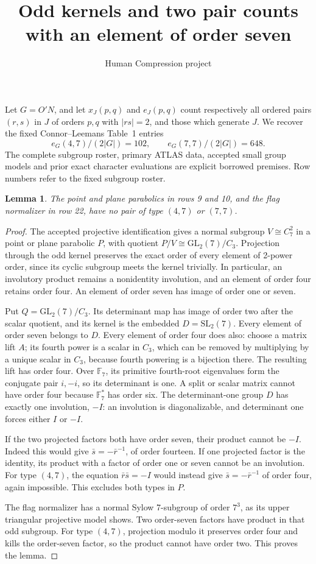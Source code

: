 \documentclass[11pt,a4paper]{article}
\title{Odd kernels and two pair counts with an element of order seven}
\author{Human Compression project}\date{}
\newtheorem{lemma}{Lemma}\newtheorem{theorem}{Theorem}
\begin{document}
\maketitle
Let $G=O'N$, and let $x_J(p,q)$ and $e_J(p,q)$ count respectively
all ordered pairs $(r,s)$ in $J$ of orders $p,q$ with $|rs|=2$, and
those which generate $J$. We recover the fixed Connor--Leemans
Table~1 entries
\[
                 e_G(4,7)/(2|G|)=102,\qquad
                 e_G(7,7)/(2|G|)=648.                         \tag{1}
\]
The complete subgroup roster, primary ATLAS data, accepted small
group models and prior exact character evaluations are explicit
borrowed premises. Row numbers refer to the fixed subgroup roster.

\begin{lemma}\label{zero}
The point and plane parabolics in rows 9 and 10, and the flag
normalizer in row 22, have no pair of type $(4,7)$ or $(7,7)$.
\end{lemma}
\begin{proof}
The accepted projective identification gives a normal subgroup
$V\cong C_7^2$ in a point or plane parabolic $P$, with quotient
$P/V\cong\mathrm{GL}_2(7)/C_3$. Projection through the odd kernel
preserves the exact order of every element of 2-power order, since
its cyclic subgroup meets the kernel trivially. In particular, an
involutory product remains a nonidentity involution, and an element
of order four retains order four. An element of order seven has
image of order one or seven.

Put $Q=\mathrm{GL}_2(7)/C_3$. Its determinant map has image of order
two after the scalar quotient, and its kernel is the embedded
$D=\mathrm{SL}_2(7)$. Every element of order seven belongs to $D$.
Every element of order four does also: choose a matrix lift $A$;
its fourth power is a scalar in $C_3$, which can be removed by
multiplying by a unique scalar in $C_3$, because fourth powering
is a bijection there. The resulting lift has order four. Over
$\mathbb F_7$, its primitive fourth-root eigenvalues form the
conjugate pair $i,-i$, so its determinant is one. A split or scalar
matrix cannot have order four because $\mathbb F_7^*$ has order six.
The determinant-one group $D$ has exactly one involution, $-I$:
an involution is diagonalizable, and determinant one forces either
$I$ or $-I$.

If the two projected factors both have order seven, their product
cannot be $-I$. Indeed this would give $\bar s=-\bar r^{-1}$,
of order fourteen. If one projected factor is the identity, its
product with a factor of order one or seven cannot be an involution.
For type $(4,7)$, the equation $\bar r\bar s=-I$ would instead
give $\bar s=-\bar r^{-1}$ of order four, again impossible.
This excludes both types in $P$.

The flag normalizer has a normal Sylow 7-subgroup of order $7^3$,
as its upper triangular projective model shows. Two order-seven
factors have product in that odd subgroup. For type $(4,7)$,
projection modulo it preserves order four and kills the order-seven
factor, so the product cannot have order two. This proves the lemma.
\end{proof}
\end{document}
